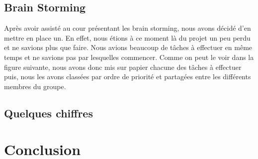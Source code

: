 \documentclass{report}
\begin{document}
\section{Brain Storming}
\hspace{0.5cm}Après avoir assisté au cour présentant les brain storming, nous avons décidé d'en mettre en place un. En effet, nous étions à ce moment là du projet un peu perdu et ne savions plus que faire. Nous avions beaucoup de tâches à effectuer en même temps et ne savions pas par lesquelles commencer. Comme on peut le voir dans la figure suivante, nous avons donc mis sur papier chacune des tâches à effectuer puis, nous les avons classées par ordre de priorité et partagées entre les différents membres du groupe. \par


\section{Quelques chiffres}

\chapter{Conclusion}
\end{document}
